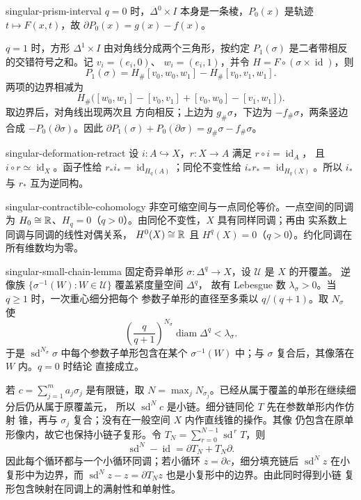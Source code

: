 \begin{solution}{singular-prism-interval}
$q=0$ 时，$\Delta^0\times I$ 本身是一条棱，$P_0(x)$ 是轨迹
$t\mapsto F(x,t)$，故
$\partial P_0(x)=g(x)-f(x)$。

$q=1$ 时，方形 $\Delta^1\times I$ 由对角线分成两个三角形，按约定
$P_1(\sigma)$ 是二者带相反的交错符号之和。记 $v_i=(e_i,0)$、
$w_i=(e_i,1)$，并令 $H=F\circ(\sigma\times\operatorname{id})$，则
\[
 P_1(\sigma)=H_\#[v_0,w_0,w_1]-H_\#[v_0,v_1,w_1].
\]
两项的边界相减为
\[
 H_\#\bigl([w_0,w_1]-[v_0,v_1]+[v_0,w_0]-[v_1,w_1]\bigr).
\]
取边界后，对角线出现两次且
方向相反；上边为 $g_\#\sigma$，下边为 $-f_\#\sigma$，两条竖边合成
$-P_0(\partial\sigma)$。因此
$\partial P_1(\sigma)+P_0(\partial\sigma)=g_\#\sigma-f_\#\sigma$。
\end{solution}

\begin{solution}{singular-deformation-retract}
设 $i:A\hookrightarrow X$，$r:X\to A$ 满足 $r\circ i=\operatorname{id}_A$，
且 $i\circ r\simeq\operatorname{id}_X$。函子性给
$r_*i_*=\operatorname{id}_{H_q(A)}$；同伦不变性给
$i_*r_*=\operatorname{id}_{H_q(X)}$。所以 $i_*$ 与 $r_*$ 互为逆同构。
\end{solution}

\begin{solution}{singular-contractible-cohomology}
非空可缩空间与一点同伦等价。一点空间的同调为
$H_0\cong\mathbb{R}$、$H_q=0$（$q>0$）。由同伦不变性，$X$ 具有同样同调；再由
实系数上同调与同调的线性对偶关系，
$H^0(X)\cong\mathbb{R}$ 且 $H^q(X)=0$（$q>0$）。约化同调在所有维数均为零。
\end{solution}

\begin{solution}{singular-small-chain-lemma}
固定奇异单形 $\sigma:\Delta^q\to X$，设 $\mathcal U$ 是 $X$ 的开覆盖。
逆像族 $\{\sigma^{-1}(W):W\in\mathcal U\}$ 覆盖紧度量空间 $\Delta^q$，
故有 Lebesgue 数 $\lambda_\sigma>0$。当 $q\geq1$ 时，一次重心细分把每个
参数子单形的直径至多乘以 $q/(q+1)$。取 $N_\sigma$ 使
\[
 \left(\frac q{q+1}\right)^{N_\sigma}
 \operatorname{diam}\Delta^q<\lambda_\sigma .
\]
于是 $\operatorname{sd}^{N_\sigma}\sigma$ 中每个参数子单形包含在某个
$\sigma^{-1}(W)$ 中；与 $\sigma$ 复合后，其像落在 $W$ 内。$q=0$ 时结论
直接成立。

若 $c=\sum_{j=1}^ma_j\sigma_j$ 是有限链，取
$N=\max_jN_{\sigma_j}$。已经从属于覆盖的单形在继续细分后仍从属于原覆盖元，
所以 $\operatorname{sd}^Nc$ 是小链。细分链同伦 $T$ 先在参数单形内作仿射
锥，再与 $\sigma_j$ 复合；没有在一般空间 $X$ 内作直线锥的操作。其像
仍包含在原单形像内，故它也保持小链子复形。令
$T_N=\sum_{r=0}^{N-1}\operatorname{sd}^{\,r}T$，则
\[
 \operatorname{sd}^N-\operatorname{id}=\partial T_N+T_N\partial.
\]
因此每个循环都与一个小循环同调；若小循环 $z=\partial c$，细分填充链后
$\operatorname{sd}^Nz$ 在小复形中为边界，而
$\operatorname{sd}^Nz-z=\partial T_Nz$ 也是小复形中的边界。由此同时得到小链
复形包含映射在同调上的满射性和单射性。
\end{solution}

